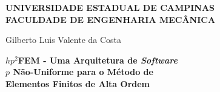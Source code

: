 \thispagestyle{fancy}
\fancyhf{}
\chead{}
\rhead{}
\lfoot{}
\cfoot{\thepage}
\begin{center}
\vspace*{2.2cm}
{\large\textbf{UNIVERSIDADE ESTADUAL DE CAMPINAS\\\vspace{1.2ex}
FACULDADE DE ENGENHARIA MECÂNICA\vspace{1.2ex}}}

\vspace{1.5cm}
{\large Gilberto Luis Valente da Costa}

\vspace{1.3cm}
{\fontsize{23}{23} \textbf{$hp^2$FEM - Uma Arquitetura de \textit{Software}}}	\\ \vspace{1.2ex}
{\fontsize{23}{23} \textbf{$p$ Não-Uniforme para o Método de}}			\\ \vspace{1.2ex}
{\fontsize{23}{23} \textbf{Elementos Finitos de Alta Ordem}}
\end{center}

